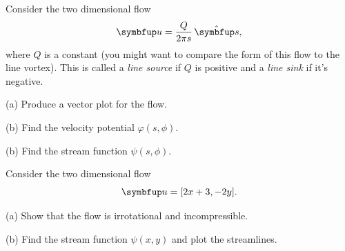 \begin{problem}
\label{prob_line_source}
Consider the two dimensional flow 
\begin{equation}
\uu = \frac{Q}{2\pi s} \, \unit{s},
\end{equation}
where $Q$ is a constant (you might want to compare the form of this flow to the line vortex).  This is called a \emph{line source} if $Q$ is positive and a \emph{line sink} if it's negative.

(a) Produce a vector plot for the flow.

(b) Find the  velocity potential $\varphi(s, \phi)$.

(b) Find the stream function $\psi(s, \phi)$.
\end{problem}

\begin{problem}
Consider the two dimensional flow
\[
\uu = [2x+3, -2y].
\]

(a) Show that the flow is irrotational and incompressible.

(b) Find the stream function $\psi(x, y)$ and plot the streamlines.
\end{problem}
